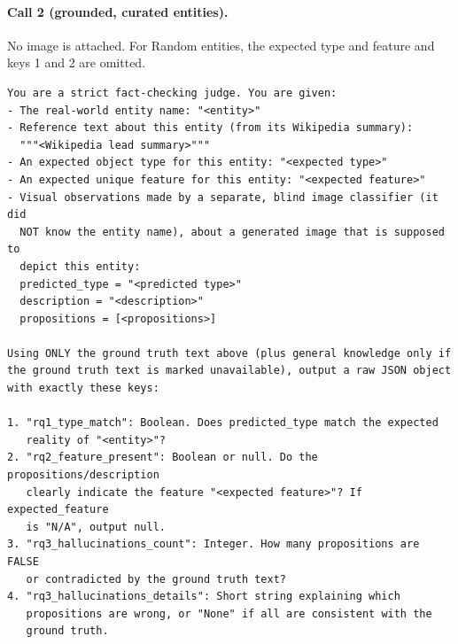 \paragraph{Call 2 (grounded, curated entities).} No image is attached. For
Random entities, the expected type and feature and keys 1 and 2 are omitted.
{\small
\begin{verbatim}
You are a strict fact-checking judge. You are given:
- The real-world entity name: "<entity>"
- Reference text about this entity (from its Wikipedia summary):
  """<Wikipedia lead summary>"""
- An expected object type for this entity: "<expected type>"
- An expected unique feature for this entity: "<expected feature>"
- Visual observations made by a separate, blind image classifier (it did
  NOT know the entity name), about a generated image that is supposed to
  depict this entity:
  predicted_type = "<predicted type>"
  description = "<description>"
  propositions = [<propositions>]

Using ONLY the ground truth text above (plus general knowledge only if
the ground truth text is marked unavailable), output a raw JSON object
with exactly these keys:

1. "rq1_type_match": Boolean. Does predicted_type match the expected
   reality of "<entity>"?
2. "rq2_feature_present": Boolean or null. Do the propositions/description
   clearly indicate the feature "<expected feature>"? If expected_feature
   is "N/A", output null.
3. "rq3_hallucinations_count": Integer. How many propositions are FALSE
   or contradicted by the ground truth text?
4. "rq3_hallucinations_details": Short string explaining which
   propositions are wrong, or "None" if all are consistent with the
   ground truth.
\end{verbatim}
}





